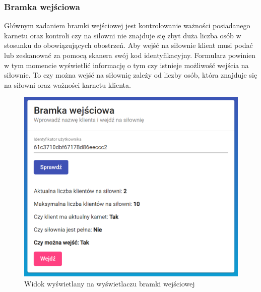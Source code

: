 \documentclass[a4paper,twoside,12pt]{book}
\begin{document}
{\subsubsection{Bramka wejściowa}
Głównym zadaniem bramki wejściowej jest kontrolowanie ważności posiadanego karnetu oraz kontroli czy na siłowni nie znajduje się zbyt duża liczba osób w stosunku do obowiązujących obostrzeń. Aby wejść na siłownie klient musi podać lub zeskanować za pomocą skanera swój kod identyfikacyjny. Formularz powinien w tym momencie wyświetlić informację o tym czy istnieje możliwość wejścia na siłownie. To czy można wejść na siłownię zależy od liczby osób, która znajduje się na siłowni oraz ważności karnetu klienta.
\begin{figure}[h!]
	\centering
	\includegraphics[width=0.8\linewidth]{../zrzuty_ekranu/dzialanie/bramki/bramka_wejsciowa}
	\caption{Widok wyświetlany na wyświetlaczu bramki wejściowej}
	\label{fig:bramkawejsciowa}
\end{figure}
\FloatBarrier

}
\end{document}
